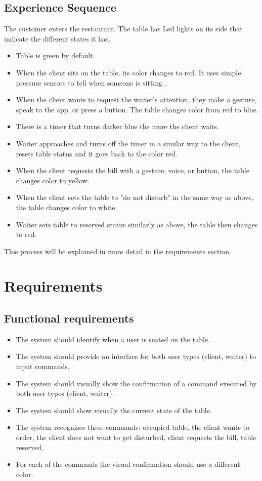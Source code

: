 \documentclass{article}
\begin{document}
\subsection{Experience Sequence }
The customer enters the restaurant. The table has Led lights on its side that indicate the different states it has.
\begin{itemize}
    \item Table is green by default.
    \item  When the client sits on the table, its color changes to red. It uses simple pressure sensors to tell when someone is sitting \cite{cheng2013smart}.
    \item When the client wants to request the waiter's attention, they make a gesture, speak to the app, or press a button. 
    The table changes color from  red to blue.
    \item  There is  a timer that turns darker blue the more the client waits.
    \item Waiter approaches and turns off the timer in a similar way to the client, resets table status and it goes back to the color red.
    \item When the client requests the bill with a gesture, voice, or button, the table changes color to yellow.
    \item When the client sets the table to "do not disturb" in the same way as above, the table changes color to white.
    \item Waiter sets table to reserved status similarly as above, the table then changes to red.
\end{itemize}
This process will be explained in more detail in the requirements section.
\section{Requirements}
\subsection{Functional requirements}
\begin{itemize}
    \item The system should identify when a user is seated on the table.
    \item The system should provide an interface for both user types (client, waiter) to input commands.
    \item The system should visually show the confirmation of a command executed by both user types (client, waiter).
    \item The system should show visually the current state of the table.
    \item The system recognizes these commands: occupied table, the client wants to order, the client does not want to get disturbed, client requests the bill, table reserved.
    \item For each of the commands the visual confirmation should use a different color.
\end{itemize}
\end{document}
